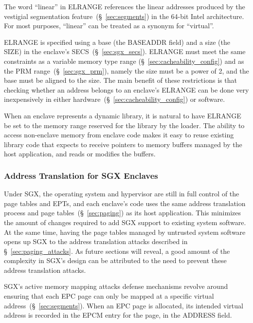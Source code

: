 The word ``linear'' in ELRANGE references the linear addresses produced by the
vestigial segmentation feature~(\S~\ref{sec:segments}) in the 64-bit Intel
architecture. For most purposes, ``linear'' can be treated as a synonym for
``virtual''.

ELRANGE is specified using a base (the BASEADDR field) and a size (the SIZE)
in the enclave's SECS~(\S~\ref{sec:sgx_secs}). ELRANGE must meet the same
constraints as a variable memory type range (\S~\ref{sec:cacheability_config})
and as the PRM range~(\S~\ref{sec:sgx_prm}), namely the size must be a power of
2, and the base must be aligned to the size. The main benefit of these
restrictions is that checking whether an address belongs to an enclave's
ELRANGE can be done very inexpensively in either
hardware~(\S~\ref{sec:cacheability_config}) or software.

When an enclave represents a dynamic library, it is natural to have ELRANGE be
set to the memory range reserved for the library by the loader. The ability to
access non-enclave memory from enclave code makes it easy to reuse existing
library code that expects to receive pointers to memory buffers managed by
the host application, and reads or modifies the buffers.


\subsubsection{Address Translation for SGX Enclaves}
\label{sec:sgx_paging}


Under SGX, the operating system and hypervisor are still in full control of the
page tables and EPTs, and each enclave's code uses the same address translation
process and page tables~(\S~\ref{sec:paging}) as its host application. This
minimizes the amount of changes required to add SGX support to existing system
software. At the same time, having the page tables managed by untrusted system
software opens up SGX to the address translation attacks described in
\S~\ref{sec:paging_attacks}. As future sections will reveal, a good amount of
the complexity in SGX's design can be attributed to the need to prevent these
address translation attacks.

SGX's active memory mapping attacks defense mechanisms revolve around ensuring
that each EPC page can only be mapped at a specific virtual
address~(\S~\ref{sec:segments}). When an EPC page is allocated, its intended
virtual address is recorded in the EPCM entry for the page, in the ADDRESS
field.


